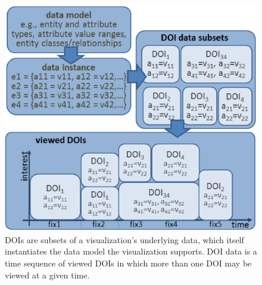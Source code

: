 \begin{figure}[htbp]
  \centering
	\includegraphics[width=\linewidth]{images/DOIDataModel.eps}
  \caption{DOIs are subsets of a visualization's underlying data, which itself instantiates the data model the visualization supports. DOI data is a time sequence of viewed DOIs in which more than one DOI may be viewed at a given time.}
	\label{fig:dataModel}
\end{figure}

